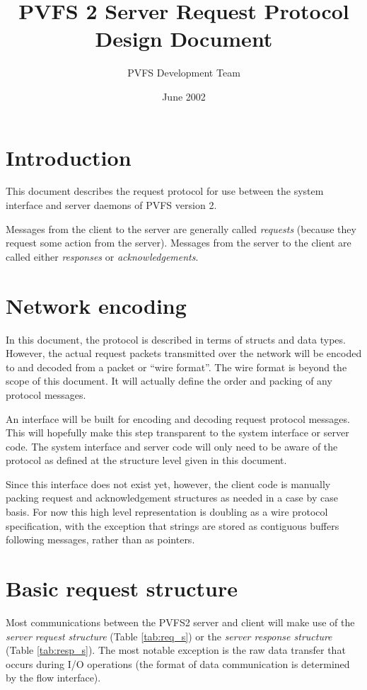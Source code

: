 \documentclass[11pt, letterpaper]{article} %
\title{PVFS 2 Server Request Protocol Design Document}
\author{PVFS Development Team}
\date{June 2002}
\begin{document}
\maketitle
\tableofcontents
\newpage

\section{Introduction}

This document describes the request protocol for use between the system
interface and server daemons of PVFS version 2.

Messages from the client to the server are generally called
\emph{requests} (because they request some action from the server).
Messages from the server to the client are called either
\emph{responses} or \emph{acknowledgements}.

\section{Network encoding}

In this document, the protocol is described in terms of structs and
data types.  However, the actual request packets transmitted over the network
will be encoded to and decoded from a packet or ``wire format''.  
The wire format is beyond the scope of this document.  It will actually 
define the order and packing of any protocol messages.

An interface will be built for encoding and decoding request protocol
messages.  This will hopefully make this step transparent to the system
interface or server code.  The system interface and server code will
only need to be aware of the protocol as defined at the structure level
given in this document.

Since this interface does not exist yet, however, the client code is
manually packing request and acknowledgement structures as needed in a
case by case basis.  For now this high level representation is doubling
as a wire protocol specification, with the exception that strings are
stored as contiguous buffers following messages, rather than as
pointers.

\section{Basic request structure}

Most communications between the PVFS2 server and client will make use of
the \emph{server request structure} (Table \ref{tab:req_s}) or the
\emph{server response structure} (Table \ref{tab:resp_s}).   The most
notable exception is the raw data transfer that occurs during I/O
operations (the format of data communication is determined by the flow
interface).
\end{document}
